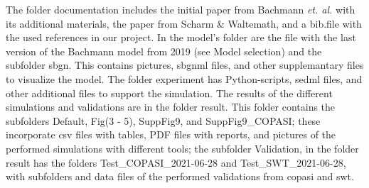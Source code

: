 The folder documentation includes the initial paper from Bachmann \textit{et. al.}  with its additional materials, the paper from Scharm \& Waltemath, and a \textsf{bib.file} with the used references in our project. In the model's folder are the file with the last version of the Bachmann model from 2019 (see Model selection) and the subfolder \textsf{sbgn}. This contains pictures, \ac{sbgnml} files, and other supplemantary files to visualize the model. The folder experiment has Python-scripts, \ac{sedml} files, and other additional files to support the simulation. The results of the different simulations and validations are in the folder result. This folder contains the subfolders Default, Fig(3 - 5), SuppFig9, and SuppFig9\_COPASI; these incorporate \ac{csv} files with tables, PDF files with reports, and pictures of the performed simulations with different tools; the subfolder Validation, in the folder result has the folders Test\_COPASI\_2021-06-28 and Test\_SWT\_2021-06-28, with subfolders and data files of the performed validations from \ac{copasi} and \ac{swt}.
